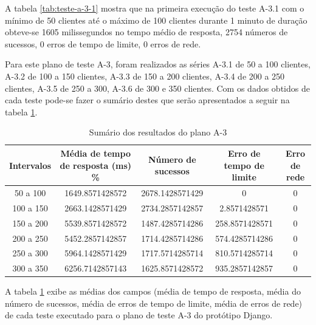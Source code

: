   A tabela \ref{tab:teste-a-3-1} mostra que na primeira execução do teste A-3.1 com o mínimo de 50 clientes até o máximo de 100 clientes
  durante 1 minuto de duração obteve-se 1605 milissegundos no tempo médio de resposta,
  2754 números de sucessos, 0 erros de tempo de limite, 0 erros de rede.
  
  Para este plano de teste A-3, foram realizados as séries A-3.1 de 50 a 100 clientes, A-3.2 de 100 a 150 clientes, A-3.3 de 150 a 200 clientes,
  A-3.4 de 200 a 250 clientes, A-3.5 de 250 a 300, A-3.6 de 300 e 350 clientes. Com os dados obtidos de cada teste pode-se fazer o sumário
  destes que serão apresentados a seguir na tabela \ref{tab:sumario-resultado-plano-teste-a-3}.
  
  \begin{table}[H]
    \centering
    \footnotesize
    \setlength{\abovecaptionskip}{0pt}
    \setlength{\belowcaptionskip}{0pt}
    \caption[Sumário dos resultados do plano A-3]{Sumário dos resultados do plano A-3}
    \label{tab:sumario-resultado-plano-teste-a-3}
    \begin{tabular}{c|c|c|c|c}
      \hline \hline
      Intervalos  & 	Média de tempo de resposta (ms) \% &	Número de sucessos & 	Erro de tempo de limite &	Erro de rede \\ 
      \hline \hline
      50 a 100 &		1649.8571428572 &		2678.1428571429 & 	0 &				0 \\
      100 a 150&		2663.1428571429 &		2734.2857142857 & 	2.8571428571  &			0 \\
      150 a 200&		5539.8571428572 &		1487.4285714286 & 	258.8571428571 &		0 \\
      200 a 250&		5452.2857142857 &		1714.4285714286 & 	574.4285714286 &		0 \\
      250 a 300&		5964.1428571429 &		1717.5714285714 & 	810.5714285714 &		0 \\
      300 a 350&		6256.7142857143 &		1625.8571428572 & 	935.2857142857 &		0 \\
      \hline \hline
    \end{tabular}
  \end{table}
   
  A tabela \ref{tab:sumario-resultado-plano-teste-a-3} exibe as médias dos campos (média de tempo de resposta, 
  média do número de sucessos, média de erros de tempo de limite, média de erros de rede) de cada teste executado 
  para o plano de teste A-3 do protótipo Django.
  
